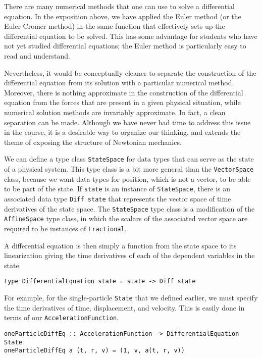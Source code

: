 \documentclass[11pt]{article}
\begin{document}
There are many numerical methods that one can use to solve a differential
equation.  In the exposition above, we have applied the Euler method
(or the Euler-Cromer method) in the same function that effectively sets
up the differential equation to be solved.  This has some advantage
for students who have not yet studied differential equations; the Euler
method is particularly easy to read and understand.

Nevertheless, it would be conceptually cleaner to separate the construction of the differential
equation from its solution with a particular numerical method.
Moreover, there is nothing approximate in the construction of the differential
equation from the forces that are present in a given physical situation,
while numerical solution methods are invariably approximate.
In fact, a clean separation can be made.  Although
we have never had time to address this issue in the course,
it is a desirable way to organize our thinking, and extends the
theme of exposing the structure of Newtonian mechanics.

We can define a type class \verb|StateSpace|
for data types that can serve as the state of a physical system.
This type class is a bit more general than the \verb|VectorSpace| class,
because we want data types for position, which is not a vector,
to be able to be part of the state.
If \verb|state| is an instance of \verb|StateSpace|,
there is an associated data type \verb|Diff state| that represents
the vector space of time derivatives of the state space.
The \verb|StateSpace| type class is a modification of the
\verb|AffineSpace| type class\cite{vector-space}, in which the
scalars of the associated vector space are required to be instances
of \verb|Fractional|.

A differential equation is then simply a function from the state space to
its linearization giving the time derivatives of each of the dependent
variables in the state.
\begin{verbatim}
type DifferentialEquation state = state -> Diff state
\end{verbatim}
For example, for the single-particle \verb|State| that we defined earlier,
we must specify the time derivatives of time, displacement, and velocity.
This is easily done in terms of our \verb|AccelerationFunction|.
\begin{verbatim}
oneParticleDiffEq :: AccelerationFunction -> DifferentialEquation State
oneParticleDiffEq a (t, r, v) = (1, v, a(t, r, v))
\end{verbatim}
\end{document}
